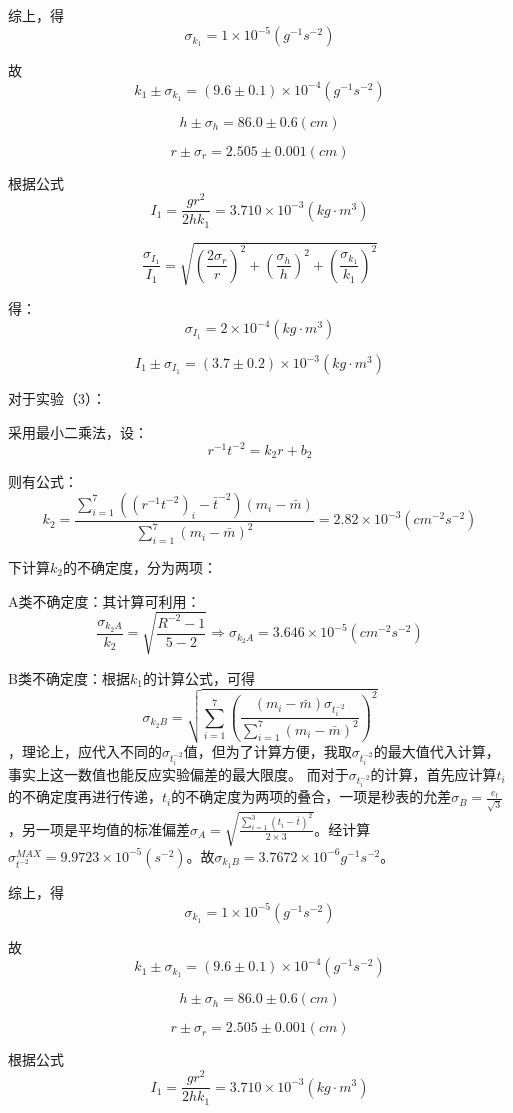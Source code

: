 \documentclass{ctexart}
\begin{document}
      综上，得$$\sigma_{k_1}=1\times10^{-5}(g^{-1}s^{-2})$$

      故$$k_1\pm\sigma_{k_1}=(9.6\pm0.1)\times10^{-4}(g^{-1}s^{-2})$$

      $$h\pm\sigma_h=86.0\pm0.6(cm)$$

      $$r\pm\sigma_r=2.505\pm0.001(cm)$$

      根据公式$$I_1=\frac{gr^2}{2hk_1}=3.710\times10^{-3}(kg\cdot m^3)$$

      $$\frac{\sigma_{I_1}}{I_1}=\sqrt{(\frac{2\sigma_r}{r})^2+(\frac{\sigma_h}{h})^2+(\frac{\sigma_{k_1}}{k_1})^2}$$

      得：$$\sigma_{I_1}=2\times10^{-4}(kg\cdot m^3)$$

      $$I_1\pm\sigma_{I_1}=(3.7\pm0.2)\times10^{-3}(kg\cdot m^3)$$
      
      对于实验（3）：

      采用最小二乘法，设：$$r^{-1}t^{-2}=k_2r+b_2$$
      
      则有公式：$$k_2=\frac{\sum\limits_{i=1}^7{((r^{-1}t^{-2})_i-\bar{t}^{-2})}(m_i-\bar{m})}{\sum\limits_{i=1}^7{(m_i-\bar{m})^2}}=2.82\times10^{-3}(cm^{-2}s^{-2})$$

      下计算$k_2$的不确定度，分为两项：
      
      A类不确定度：其计算可利用：$$\frac{\sigma_{k_2A}}{k_2}=\sqrt{\frac{R^{-2}-1}{5-2}}\Rightarrow\sigma_{k_2A}=3.646\times10^{-5}(cm^{-2}s^{-2})$$

      B类不确定度：根据$k_1$的计算公式，可得$$\sigma_{k_2B}=\sqrt{\sum\limits_{i=1}^7({\frac{(m_i-\bar{m})\sigma_{t^{-2}_i}}{\sum\limits_{i=1}^7{(m_i-\bar{m})^2}}})^2}$$，理论上，应代入不同的$\sigma_{t^{-2}_i}$值，但为了计算方便，我取$\sigma_{t_i^{-2}}$的最大值代入计算，事实上这一数值也能反应实验偏差的最大限度。
      而对于$\sigma_{t_i^{-2}}$的计算，首先应计算$t_i$的不确定度再进行传递，$t_i$的不确定度为两项的叠合，一项是秒表的允差$\sigma_B=\frac{e_t}{\sqrt{3}}$，另一项是平均值的标准偏差$\sigma_A=\sqrt{{\frac{\sum\limits_{i=1}^3(t_i-\bar{t})^2}{2\times3}}}$。经计算$\sigma_{t^{-2}}^{MAX}=9.9723\times10^{-5}(s^{-2})$。故$\sigma_{k_1B}=3.7672\times10^{-6}{g^{-1}s^{-2}}$。

      综上，得$$\sigma_{k_1}=1\times10^{-5}(g^{-1}s^{-2})$$

      故$$k_1\pm\sigma_{k_1}=(9.6\pm0.1)\times10^{-4}(g^{-1}s^{-2})$$

      $$h\pm\sigma_h=86.0\pm0.6(cm)$$

      $$r\pm\sigma_r=2.505\pm0.001(cm)$$

      根据公式$$I_1=\frac{gr^2}{2hk_1}=3.710\times10^{-3}(kg\cdot m^3)$$
\end{document}
